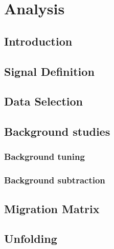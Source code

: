 \chapter{Analysis}
\minitoc
\label{Cap:Analysis}

\section{Introduction}



\section{Signal Definition}

\section{Data Selection}



\section{Background studies}

\subsection{Background tuning}

\subsection{Background subtraction}

\section{Migration Matrix}



\section{Unfolding}

